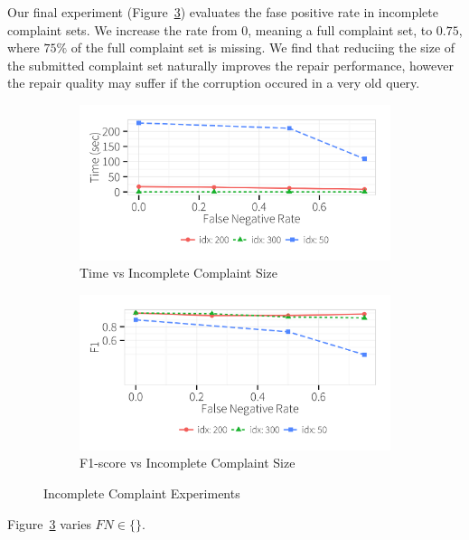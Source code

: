 Our final experiment (Figure~\ref{f:falsenegative}) evaluates the fase positive rate in incomplete complaint sets.
We increase the rate from $0$, meaning a full complaint set, to $0.75$, where 
$75\%$ of the full complaint set is missing.  
We find that reduciing the size of the submitted complaint set naturally improves the repair performance,
however the repair quality may suffer if the corruption occured in a very old query.


  \begin{figure}[h!]
    \centering
    \begin{subfigure}[t]{\columnwidth}
    \includegraphics[width = .9\columnwidth]{figures/noise_fn_time}
    \caption{Time vs Incomplete Complaint Size}
    \label{f:falsenegative_time} 
    \end{subfigure}
    \begin{subfigure}[t]{\columnwidth}
    \includegraphics[width = .9\columnwidth]{figures/noise_fn_acc}
    \caption{F1-score vs Incomplete Complaint Size}
    \label{f:falsenegative_acc} 
    \end{subfigure}
    \label{f:falsenegative}
    \caption{Incomplete Complaint Experiments}
  \end{figure}

Figure~\ref{f:falsenegative} varies $FN \in \{\}$.



